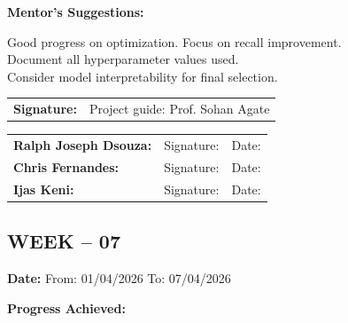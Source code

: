 \documentclass[12pt,a4paper]{article}
\begin{document}
\medskip

\noindent\textbf{Mentor's Suggestions:}

\medskip

\noindent Good progress on optimization. Focus on recall improvement. \\
Document all hyperparameter values used. \\
Consider model interpretability for final selection.

\medskip

\noindent\begin{tabular}{p{4cm} p{6cm}}
\textbf{Signature:} & Project guide: Prof. Sohan Agate \\
\end{tabular}

\medskip

\noindent\begin{tabular}{p{3.5cm} p{5cm} p{3cm}}
\textbf{Ralph Joseph Dsouza:} & Signature: \underline{\hspace{4cm}} & Date: \underline{\hspace{2cm}} \\
\textbf{Chris Fernandes:} & Signature: \underline{\hspace{4cm}} & Date: \underline{\hspace{2cm}} \\
\textbf{Ijas Keni:} & Signature: \underline{\hspace{4cm}} & Date: \underline{\hspace{2cm}} \\
\end{tabular}

\newpage

\subsection*{WEEK – 07}
\vspace{0.3cm}

\textbf{Date:} From: 01/04/2026 To: 07/04/2026

\medskip

\noindent\textbf{Progress Achieved:}

\medskip
\end{document}
